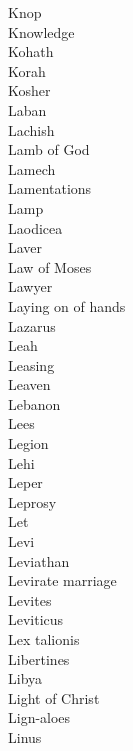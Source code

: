 Knop  \\
Knowledge  \\
Kohath  \\
Korah  \\
Kosher  \\
Laban  \\
Lachish  \\
Lamb of God  \\
Lamech  \\
Lamentations  \\
Lamp  \\
Laodicea  \\
Laver  \\
Law of Moses  \\
Lawyer  \\
Laying on of hands  \\
Lazarus  \\
Leah  \\
Leasing  \\
Leaven  \\
Lebanon  \\
Lees  \\
Legion  \\
Lehi  \\
Leper  \\
Leprosy  \\
Let  \\
Levi  \\
Leviathan  \\
Levirate marriage  \\
Levites  \\
Leviticus  \\
Lex talionis  \\
Libertines  \\
Libya  \\
Light of Christ  \\
Lign-aloes  \\
Linus  \\
